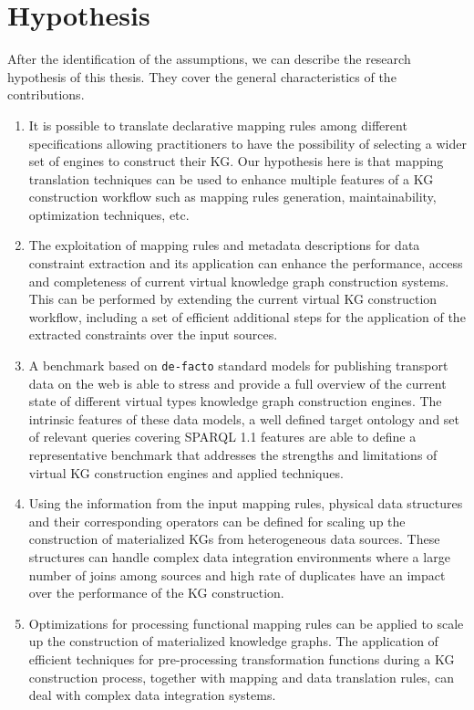 \section{Hypothesis}
After the identification of the assumptions, we can describe the research hypothesis of this thesis. They cover the general characteristics of the contributions.
\begin{enumerate}[label=\textbf{H{\arabic*}}]
    \item It is possible to translate declarative mapping rules among different specifications allowing practitioners to have the possibility of selecting a wider set of engines to construct their KG. Our hypothesis here is that mapping translation techniques can be used to enhance multiple features of a KG construction workflow such as mapping rules generation, maintainability, optimization techniques, etc.
    \item The exploitation of mapping rules and metadata descriptions for data constraint extraction and its application can enhance the performance, access and completeness of current virtual knowledge graph construction systems. This can be performed by extending the current virtual KG construction workflow, including a set of efficient additional steps for the application of the extracted constraints over the input sources. 
    \item A benchmark based on \texttt{de-facto} standard models for publishing transport data on the web is able to stress and provide a full overview of the current state of different virtual types knowledge graph construction engines. The intrinsic features of these data models, a well defined target ontology and set of relevant queries covering SPARQL 1.1 features are able to define a representative benchmark that addresses the strengths and limitations of virtual KG construction engines and applied techniques.
    \item Using the information from the input mapping rules, physical data structures and their corresponding operators can be defined for scaling up the construction of materialized KGs from heterogeneous data sources. These structures can handle complex data integration environments where a large number of joins among sources and high rate of duplicates have an impact over the performance of the KG construction. 
    \item Optimizations for processing functional mapping rules can be applied to scale up the construction of materialized knowledge graphs. The application of efficient techniques for pre-processing transformation functions during a KG construction process, together with mapping and data translation rules, can deal with complex data integration systems. 
    
\end{enumerate}

